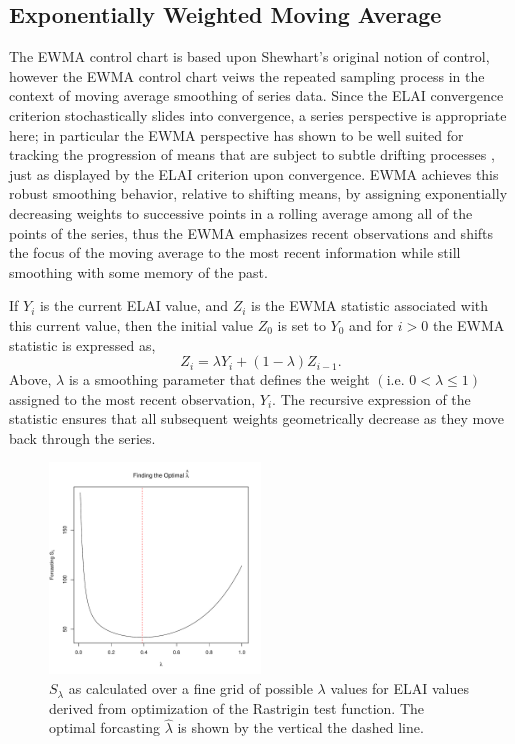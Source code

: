 \documentclass[12pt]{article}
\begin{document}
%
%
\subsection{Exponentially Weighted Moving Average}
%
%

%
The EWMA control chart is based upon Shewhart's original notion of control, however the EWMA control chart veiws the repeated sampling process in the context of moving average smoothing of series data. %
Since the ELAI convergence criterion stochastically slides into convergence, a series perspective is appropriate here; in particular the EWMA perspective has shown to be well suited for tracking the progression of means that are subject to subtle drifting processes \cite{adaptEWMA, ?}, just as displayed by the ELAI criterion upon convergence.
%
EWMA achieves this robust smoothing behavior, relative to shifting means, by assigning exponentially decreasing weights to successive points in a rolling average among all of the points of the series, thus the EWMA emphasizes recent observations and shifts the focus of the moving average to the most recent information while still smoothing with some memory of the past.

%
%

If $Y_i$ is the current ELAI value, and $Z_i$ is the EWMA statistic associated with this current value, then the initial value $Z_0$ is set to $Y_0$ and for $i>0$ the EWMA statistic is expressed as,
%
\begin{equation}
Z_i=\lambda Y_i+(1-\lambda)Z_{i-1}.
\label{ewmaStat}
\end{equation}
%
Above, $\lambda$ is a smoothing parameter that defines the weight $\left( \text{i.e. }0<\lambda\le1\right)$ assigned to the most recent observation, $Y_i$.
The recursive expression of the statistic ensures that all subsequent weights geometrically decrease as they move back through the series.

\clearpage
%
%
\begin{figure}
\includegraphics[width=0.5\textwidth]{./figures/ssRastHardOpt.pdf}
\caption{ $S_\lambda$ as calculated over a fine grid of possible $\lambda$ values for ELAI values derived from optimization of the Rastrigin test function. The optimal forcasting $\hat\lambda$ is shown by the vertical the dashed line. }
\label{bestL}
\end{figure}
%
%
\end{document}
